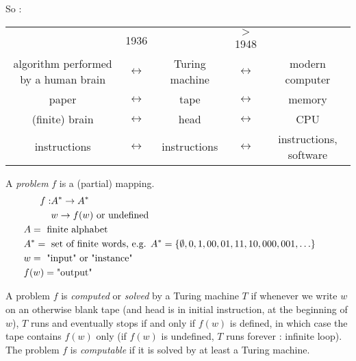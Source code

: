 \documentclass[12pt,a4paper]{report}
\theoremstyle{break}
\begin{document}
So : 
\begin{center}
\begin{tabular}{ccccc}
&{\color{cyan}1936}&&{\color{cyan}$>$1948}&\\
algorithm performed by a human brain&{\color{cyan}\huge{$\leftrightarrow$}}&Turing machine&{\color{cyan}\huge{$\leftrightarrow$}}&modern computer\\
paper&{\color{cyan}\huge{$\leftrightarrow$}}&tape&{\color{cyan}\huge{$\leftrightarrow$}}&memory\\
(finite) brain&{\color{cyan}\huge{$\leftrightarrow$}}&head&{\color{cyan}\huge{$\leftrightarrow$}}&CPU\\
instructions&{\color{cyan}\huge{$\leftrightarrow$}}&instructions&{\color{cyan}\huge{$\leftrightarrow$}}&instructions, software\\
\end{tabular}
\end{center}

A \emph{problem} $f$ is a (partial) mapping.\\
\vspace*{-0.5cm}
\begin{align*}
f:& A^*\rightarrow A^*\\
& w \rightarrow f(w) \text{ or undefined}\\
&\hspace*{-1cm} A=\text{ finite alphabet}\\
&\hspace*{-1cm}A^*=\text{ set of finite words, e.g. } A^*=\{\emptyset, 0, 1, 00, 01, 11, 10, 000, 001, \hdots\}\\
&\hspace*{-1cm}w=\text{ "input" or "instance"}\\
&\hspace*{-1cm}f(w)= \text{"output"}\\
\end{align*}

A problem $f$ is \emph{computed} or \emph{solved} by a Turing machine $T$ if whenever we write $w$ on an otherwise blank tape (and head is in initial instruction, at the beginning of $w$), $T$ runs and eventually stops if and only if $f(w)$ is defined, in which case the tape contains $f(w)$ only (if $f(w)$ is undefined, $T$ runs forever : infinite loop).\\

The problem $f$ is \emph{computable} if it is solved by at least a Turing machine.\\
\end{document}
